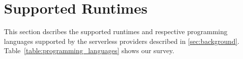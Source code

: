 
\section{Supported Runtimes}\label{sec:runtime}
This section dscribes the supported runtimes and respective programming languages supported by the serverless providers described in \ref{sec:background}. 
Table~\ref{table:programming_languages} shows our survey. %
